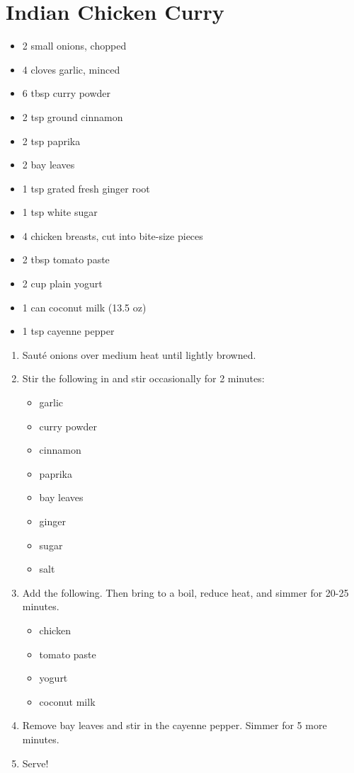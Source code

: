 \section{Indian Chicken Curry}

\begin{itemize}
\item 2 small onions, chopped
\item 4 cloves garlic, minced
\item 6 tbsp curry powder
\item 2 tsp ground cinnamon
\item 2 tsp paprika
\item 2 bay leaves
\item 1 tsp grated fresh ginger root
\item 1 tsp white sugar
\item 4 chicken breasts, cut into bite-size pieces
\item 2 tbsp tomato paste
\item 2 cup plain yogurt
\item 1 can coconut milk (13.5 oz)
\item 1 tsp cayenne pepper
\end{itemize}

\begin{enumerate}
\item Saut\'e onions over medium heat until lightly browned.
\item Stir the following in and stir occasionally for 2 minutes:
\begin{itemize}
    \item garlic
    \item curry powder
    \item cinnamon
    \item paprika
    \item bay leaves
    \item ginger
    \item sugar
    \item salt
\end{itemize}
\item Add the following. Then bring to a boil, reduce heat, and simmer for 20-25 minutes.
\begin{itemize}
    \item chicken
    \item tomato paste
    \item yogurt
    \item coconut milk
\end{itemize}
\item Remove bay leaves and stir in the cayenne pepper. Simmer for 5 more minutes.
\item Serve!
\end{enumerate}
